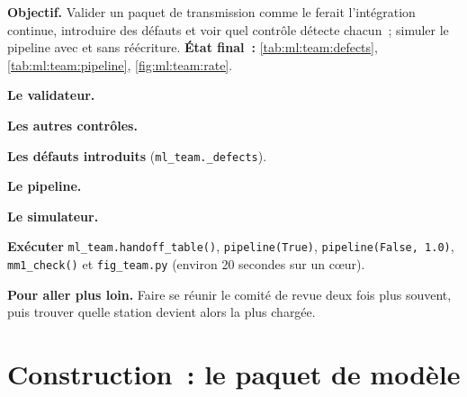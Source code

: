 \begin{tutorial}
\textbf{Objectif.} Valider un paquet de transmission comme le ferait l'intégration continue, introduire des défauts et voir quel contrôle détecte chacun~;
simuler le pipeline avec et sans réécriture. \textbf{État final~:} \cref{tab:ml:team:defects}, \cref{tab:ml:team:pipeline},
\cref{fig:ml:team:rate}.
\begin{tutsteps}
\item \textbf{Le validateur.}
\label{lst:ml:team:validate}
\item \textbf{Les autres contrôles.}
\label{lst:ml:team:checks}
\item \textbf{Les défauts introduits} (\texttt{ml\_team.\_defects}).
\label{lst:ml:team:defects}
\item \textbf{Le pipeline.}
\label{lst:ml:team:stations}
\item \textbf{Le simulateur.}
\label{lst:ml:team:sim}
\item \textbf{Exécuter} \texttt{ml\_team.handoff\_table()}, \texttt{pipeline(True)}, \texttt{pipeline(False, 1.0)},
\texttt{mm1\_check()} et \texttt{fig\_team.py} (environ 20 secondes sur un cœur).
\end{tutsteps}
\textbf{Pour aller plus loin.} Faire se réunir le comité de revue deux fois plus souvent, puis trouver quelle station devient alors la plus chargée.
\end{tutorial}

\section{Construction~: le paquet de modèle}\label{bld:ml:the-machine-learning-team:modelpkg}

